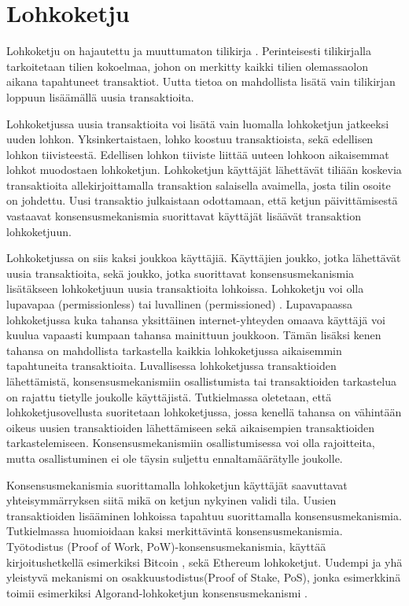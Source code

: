 \section{Lohkoketju}

Lohkoketju on hajautettu ja muuttumaton tilikirja \cite{8760539}. Perinteisesti tilikirjalla tarkoitetaan tilien kokoelmaa, johon on merkitty kaikki tilien olemassaolon aikana tapahtuneet transaktiot. Uutta tietoa on mahdollista lisätä vain tilikirjan loppuun lisäämällä uusia transaktioita.

Lohkoketjussa uusia transaktioita voi lisätä vain luomalla lohkoketjun jatkeeksi uuden lohkon. Yksinkertaistaen, lohko koostuu transaktioista, sekä edellisen lohkon tiivisteestä. Edellisen lohkon tiiviste liittää uuteen lohkoon aikaisemmat lohkot muodostaen lohkoketjun. Lohkoketjun käyttäjät lähettävät tiliään koskevia transaktioita allekirjoittamalla transaktion salaisella avaimella, josta tilin osoite on johdettu. Uusi transaktio julkaistaan odottamaan, että ketjun päivittämisestä vastaavat konsensusmekanismia suorittavat käyttäjät lisäävät transaktion lohkoketjuun. 

Lohkoketjussa on siis kaksi joukkoa käyttäjiä. Käyttäjien joukko, jotka lähettävät uusia transaktioita, sekä joukko, jotka suorittavat konsensusmekanismia lisätäkseen lohkoketjuun uusia transaktioita lohkoissa. Lohkoketju voi olla lupavapaa (permissionless) tai luvallinen (permissioned) \cite{8760539}. Lupavapaassa lohkoketjussa kuka tahansa yksittäinen internet-yhteyden omaava käyttäjä voi kuulua vapaasti kumpaan tahansa mainittuun joukkoon. Tämän lisäksi kenen tahansa on mahdollista tarkastella kaikkia lohkoketjussa aikaisemmin tapahtuneita transaktioita. Luvallisessa lohkoketjussa transaktioiden lähettämistä, konsensusmekanismiin osallistumista tai transaktioiden tarkastelua on rajattu tietylle joukolle käyttäjistä. Tutkielmassa oletetaan, että lohkoketjusovellusta suoritetaan lohkoketjussa, jossa kenellä tahansa on vähintään oikeus uusien transaktioiden lähettämiseen sekä aikaisempien transaktioiden tarkastelemiseen. Konsensusmekanismiin osallistumisessa voi olla rajoitteita, mutta osallistuminen ei ole täysin suljettu ennaltamäärätylle joukolle.

Konsensusmekanismia suorittamalla lohkoketjun käyttäjät saavuttavat yhteisymmärryksen siitä mikä on ketjun nykyinen validi tila. Uusien transaktioiden lisääminen lohkoissa tapahtuu suorittamalla konsensusmekanismia. Tutkielmassa huomioidaan kaksi merkittävintä konsensusmekanismia. Työtodistus (Proof of Work, PoW)-konsensusmekanismia, käyttää kirjoitushetkellä esimerkiksi Bitcoin \cite{Nakamoto_bitcoin}, sekä Ethereum \cite{buterin_ethereum_2014} lohkoketjut. Uudempi ja yhä yleistyvä mekanismi on osakkuustodistus(Proof of Stake, PoS), jonka esimerkkinä toimii esimerkiksi Algorand-lohkoketjun konsensusmekanismi \cite{gilad_algorand_2017}. 

